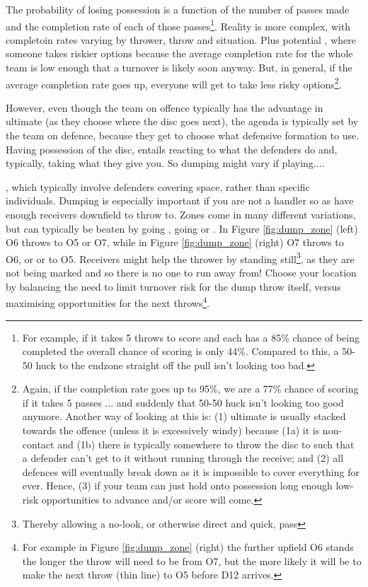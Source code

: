 \documentclass{tufte-handout}
\begin{document}
The probability 
of losing possession
is a function of 
the number of passes made 
and the completion rate of 
each of those passes\footnote{
For example,  
if it takes 5 throws
to score and 
each has a 85\% chance 
of being completed
the overall chance 
of scoring is only 44\%.
Compared to this, 
a 50-50 huck
to the endzone
straight off the pull 
isn't looking too bad.}.
Reality is more complex, 
with
completoin rates 
varying by 
thrower, 
throw 
and situation. 
Plus potential 
,  
where someone 
takes riskier options 
because the average 
completion rate 
for the whole team
is low enough 
that a turnover is 
likely soon anyway.
But, in general, 
if the average completion rate 
goes up, 
everyone will get 
to take less risky options\footnote{
Again,  
if the completion rate 
goes up 
to 95\%, 
we are a 77\% chance 
of scoring if it takes 
5 passes
... and suddenly 
that 50-50 huck 
isn't looking too good anymore. Another way of looking at this 
is: (1) ultimate
is usually stacked towards 
the offence 
(unless 
it is 
excessively 
windy)
because (1a) it is non-contact 
and (1b) there is 
typically 
somewhere
to throw the disc to 
such that a defender 
can't get to it without running 
through the receive; 
and (2) all defences 
will eventually 
break down 
as it is impossible to 
cover everything 
for ever. 
Hence, 
(3) if your team 
can just hold onto
possession 
long enough
low-risk
opportunities to 
advance and/or score
will come.}.

However, 
even though 
the team on offence 
typically
has the advantage 
in ultimate 
(as they choose 
where the disc 
goes next), 
the agenda is 
typically set 
by the team 
on defence, 
because they 
get to choose 
what defensive formation 
to use.
Having possession 
of the disc, 
entails 
reacting 
to what 
the defenders 
do and, 
typically, 
taking what they give you. 
So dumping 
might vary if playing.... 

,
which typically
involve defenders 
covering space, 
rather than 
specific individuals. 
Dumping is 
especially important 
if you 
are not 
a handler 
so as have
enough 
receivers 
downfield 
to throw to.
Zones come in
many different variations, 
but can typically be 
beaten 
by going , 
going  or 
. 
In Figure \ref{fig:dump_zone}
(left) O6 throws 
to O5 or O7, 
while in Figure \ref{fig:dump_zone}
(right) O7 throws 
 to O6, 
or  
or  
to O5. 
Receivers
might help 
the thrower 
by standing still\footnote{
Thereby allowing 
a no-look, 
or otherwise direct 
and quick,
pass}, 
as they are not 
being marked 
and so there is no one 
to run away from!
Choose your location 
by balancing the 
need to 
limit turnover risk
for the dump throw itself, 
versus 
maximising 
opportunities 
for the next throws\footnote{
For example
in Figure \ref{fig:dump_zone} (right)
the further upfield O6 stands 
the longer the throw 
will need to be 
from O7, but
the more likely 
it will be to make 
the next throw 
(thin line) to O5 
before D12 arrives.}. 
\end{document}
